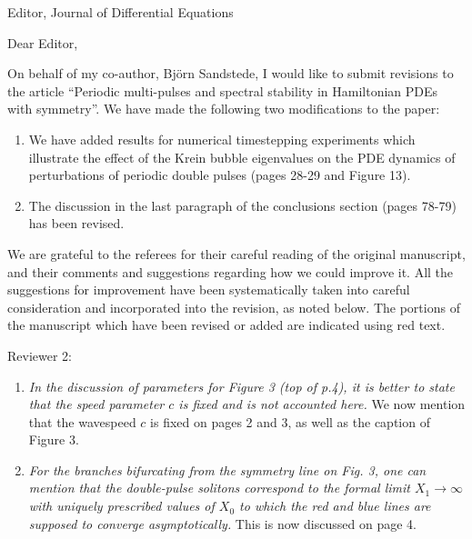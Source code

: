 \documentclass[11pt]{letter}
\begin{document}
\address{Ross Parker \\
Department of Mathematics \\
Southern Methodist University \\
Dallas, TX 75275 \\
\texttt{rhparker@smu.edu}}%
\signature{Ross Parker}
\begin{letter}{Editor, Journal of Differential Equations}

\opening{Dear Editor,}

On behalf of my co-author, Bj\"orn Sandstede, I would like to submit revisions to the article ``Periodic multi-pulses and spectral stability in Hamiltonian PDEs with symmetry''. We have made the following two modifications to the paper:
\begin{enumerate}
    \item We have added results for numerical timestepping experiments which illustrate the effect of the Krein bubble eigenvalues on the PDE dynamics of perturbations of periodic double pulses (pages 28-29 and Figure 13).
    \item The discussion in the last paragraph of the conclusions section (pages 78-79) has been revised.
\end{enumerate}

We are grateful to the referees for their careful reading of the original manuscript, and their comments and suggestions regarding how we could improve it. All the suggestions for improvement have been systematically taken into careful consideration and incorporated into the revision, as noted below. The portions of the manuscript which have been revised or added are indicated using red text.

Reviewer 2:
\begin{enumerate}
    \item \emph{In the discussion of parameters for Figure 3 (top of p.4), it is better to state that the speed parameter $c$ is fixed and is not accounted here.} We now mention that the wavespeed $c$ is fixed on pages 2 and 3, as well as the caption of Figure 3.
    \vspace{4mm}

    \item \emph{For the branches bifurcating from the symmetry line on Fig. 3, one can mention that the double-pulse solitons correspond to the formal limit $X_1 \rightarrow \infty$ with uniquely prescribed values of $X_0$ to which the red and blue lines are supposed to converge asymptotically.} This is now discussed on page 4.
    \vspace{4mm}


\end{enumerate}
\end{letter}
\end{document}
